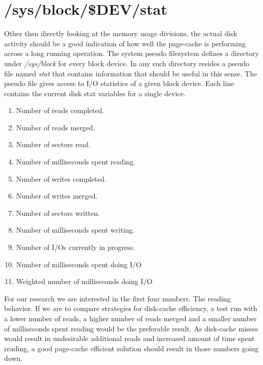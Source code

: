 \section{/sys/block/\$DEV/stat}
Other then directly looking at the memory usage divisions, the actual disk activity should be a good indication of how well the page-cache is performing across a long running operation. The system pseudo filesystem defines a directory under \emph{/sys/block} for every block device. In any such directory resides a pseudo file named \emph{stat} that contains information that should be useful in this sense. The pseudo file gives access to I/O statistics of a given block device. Each line contains the current disk stat variables for a single device. 
\begin{enumerate}
\item Number of reads completed.
\item Number of reads merged.
\item Number of sectors read.
\item Number of milliseconds spent reading.
\item Number of writes completed.
\item Number of writes merged.
\item Number of sectors written.
\item Number of milliseconds spent writing.
\item Number of I/Os currently in progress.
\item Number of milliseconds spent doing I/O
\item Weighted number of milliseconds doing I/O
\end{enumerate} 
For our research we are interested in the first four numbers. The reading behavior. If we are to compare strategies for disk-cache efficiency, a test run with a lower number of reads, a higher number of reads merged and a smaller number of milliseconds spent reading would be the preferable result. As disk-cache misses would result in undesirable additional reads and increased amount of time spent reading, a good page-cache efficient solution should result in those numbers going down. 
